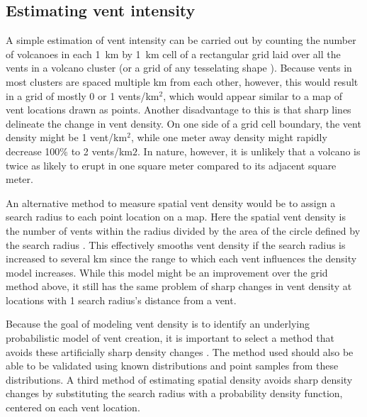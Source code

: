 \subsection{Estimating vent intensity} 
A simple estimation of vent intensity can be carried out by counting the number of volcanoes in each 1~km by 1~km cell of a rectangular grid laid over all the vents in a volcano cluster \citep{lutz1995improved} (or a grid of any tesselating shape \citep{glaze2005statistical}). Because vents in most clusters are spaced multiple km from each other, however, this would result in a grid of mostly 0 or 1 vents/km$^2$, which would appear similar to a map of vent locations drawn as points. Another disadvantage to this is that sharp lines delineate the change in vent density. On one side of a grid cell boundary, the vent density might be 1 vent/km$^2$, while one meter away density might rapidly decrease 100\% to 2 vents/km$2$. In nature, however, it is unlikely that a volcano is twice as likely to erupt in one square meter compared to its adjacent square meter.

An alternative method to measure spatial vent density would be to assign a search radius to each point location on a map. Here the spatial vent density is the number of vents within the radius divided by the area of the circle defined by the search radius \citep{connor1987structure,connor1990cinder}. This effectively smooths vent density if the search radius is increased to several km since the range to which each vent influences the density model increases. While this model might be an improvement over the grid method above, it still has the same problem of sharp changes in vent density at locations with 1 search radius's distance from a vent. 

Because the goal of modeling vent density is to identify an underlying probabilistic model of vent creation, it is important to select a method that avoids these artificially sharp density changes \citep{connor1995three}. The method used should also be able to be validated using known distributions and point samples from these distributions. A third method of estimating spatial density avoids sharp density changes by substituting the search radius with a probability density function, centered on each vent location.

